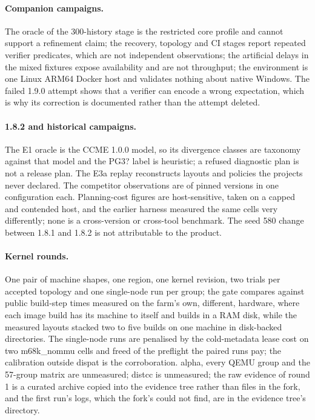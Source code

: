 \paragraph{Companion campaigns.}
The oracle of the 300-history stage is the restricted core profile and cannot
support a refinement claim; the recovery, topology and CI stages report
repeated verifier predicates, which are not independent observations; the
artificial delays in the mixed fixtures expose availability and are not
throughput; the environment is one Linux ARM64 Docker host and validates
nothing about native Windows. The failed 1.9.0 attempt shows that a verifier
can encode a wrong expectation, which is why its correction is documented
rather than the attempt deleted.

\paragraph{1.8.2 and historical campaigns.}
The E1 oracle is the CCME 1.0.0 model, so its divergence classes are taxonomy
against that model and the PG3? label is heuristic; a refused diagnostic plan
is not a release plan. The E3a replay reconstructs layouts and policies the
projects never declared. The competitor observations are of pinned versions in
one configuration each. Planning-cost figures are host-sensitive, taken on a
capped and contended host, and the earlier harness measured the same cells
very differently; none is a cross-version or cross-tool benchmark. The seed
580 change between 1.8.1 and 1.8.2 is not attributable to the product.

\paragraph{Kernel rounds.}
One pair of machine shapes, one region, one kernel revision, two trials per
accepted topology and one single-node run per group; the gate compares
against public build-step times measured on the farm's own, different,
hardware, where each image build has its machine to itself and builds in a RAM
disk, while the measured layouts stacked two to five builds on one machine in
disk-backed directories. The single-node
runs are penalised by the cold-metadata lease cost on two m68k\_nommu cells and
freed of the preflight the paired runs pay; the calibration outside dispat is
the corroboration. alpha, every QEMU group and the 57-group matrix are
unmeasured; distcc is unmeasured; the raw evidence of round 1 is a curated
archive copied into the evidence tree rather than files in the fork, and the
first run's logs, which the fork's  could not find, are in
the evidence tree's  directory.

